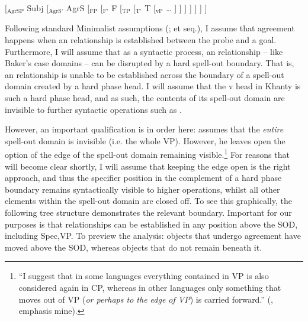 \documentclass[output=paper
,modfonts
,nonflat]{langsci/langscibook}
\begin{document}
\begin{exe}
\ex
{[$_{\textrm{AgrSP}}$ Subj [$_{\textrm{AgrS'}}$ AgrS [$_{\textrm{FP}}$  [$_{\textrm{F'}}$ F [$_{\textrm{TP}}$  [$_{\textrm{T'}}$ T [$_{\textrm{vP}}$ {\ldots} ] ] ] ] ] ] ]}
\end{exe}

\noindent Following standard Minimalist assumptions (\citealt{Chomsky2000,Chomsky2001}; et seq.), I assume that agreement happens when an \agree{} relationship is established between the probe and a goal. 
Furthermore, I will assume that as a syntactic process, an \agree{} relationship -- like Baker's case domains -- can be disrupted by a hard spell-out boundary. That is, an \agree{} relationship is unable to be established across the boundary of a spell-out domain created by a hard phase head.
I will assume that the v head in Khanty is such a hard phase head, and as such, the contents of its spell-out domain are invisible to further syntactic operations such as \agree.

However, an important qualification is in order here: \citet{Baker2015} assumes that the \emph{entire} spell-out domain is invisible (i.e. the whole VP). However, he leaves open the option of the edge of the spell-out domain remaining visible.\footnote{``I suggest that in some languages everything contained in VP is also considered again in CP, whereas in other languages only something that moves out of VP (\emph{or perhaps to the edge of VP}) is carried forward.'' (\citealt[149]{Baker2015}, emphasis mine).} 
For reasons that will become clear shortly, I will assume that keeping the edge open is the right approach, and thus the specifier position in the complement of a hard phase boundary remains syntactically visible to higher operations, whilst all other elements within the spell-out domain are closed off. 
To see this graphically, the following tree structure demonstrates the relevant boundary. 
Important for our purposes is that \agree{} relationships can be established in any position above the SOD, including Spec,VP.
To preview the analysis: objects that undergo agreement have moved above the SOD, whereas objects that do not remain beneath it.
 
\begin{exe}
\ex \label{ex:khantyfp}
\end{exe}
\end{document}
